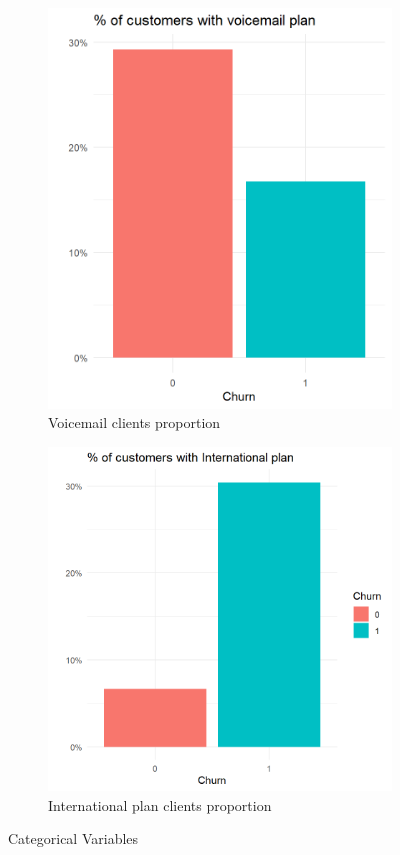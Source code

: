 \documentclass[12pt,letterpaper]{article}
\begin{document}
	\begin{figure}[!htb]
		\begin{subfigure}{.5\textwidth}
		\centering
		\includegraphics[scale=0.7]{images/voicemail.png}
		\caption{Voicemail clients proportion}
		\label{voicemail}
	\end{subfigure}
	\begin{subfigure}{.5\textwidth}
		\centering
		\includegraphics[scale=0.7]{images/international.png}
		\caption{International plan clients proportion}
		\label{international}
		\end{subfigure}
	\caption{Categorical Variables}
	\end{figure}
\end{document}
